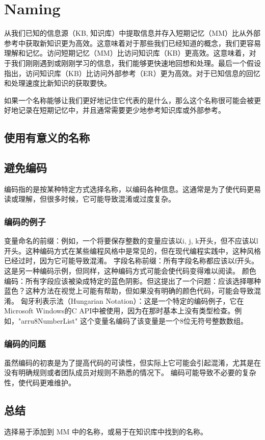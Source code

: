 \documentclass[]{ctexbook}
\begin{document}
\chapter{Naming}

从我们已知的信息源（KB, 知识库）中提取信息并存入短期记忆（MM）比从外部参考中获取新知识更为高效。这意味着对于那些我们已经知道的概念，我们更容易理解和记忆。访问短期记忆（MM）比访问知识库（KB）更高效。这意味着，对于我们刚刚遇到或刚刚学习的信息，我们能够更快速地回想和处理。最后一个假设指出，访问知识库（KB）比访问外部参考（ER）更为高效。对于已知信息的回忆和处理速度比新知识的获取要快。

如果一个名称能够让我们更好地记住它代表的是什么，那么这个名称很可能会被更好地记录在短期记忆中，并且通常需要更少地参考知识库或外部参考。
\section{使用有意义的名称}
\section{避免编码}
编码指的是按某种特定方式选择名称，以编码各种信息。这通常是为了使代码更易读或理解，但很多时候，它可能导致混淆或过度复杂。

\subsection{编码的例子}
变量命名的前缀：例如，一个将要保存整数的变量应该以i, j, k开头，但不应该以l开头。这种编码方式在某些编程风格中是常见的，但在现代编程实践中，这种风格已经过时，因为它可能导致混淆。
字段名称前缀：所有字段名称都应该以f开头。这是另一种编码示例，但同样，这种编码方式可能会使代码变得难以阅读。
颜色编码：所有字段应该被染成特定的蓝色阴影。但这提出了一个问题：应该选择哪种蓝色？这种方法在视觉上可能有帮助，但如果没有明确的颜色代码，可能会导致混淆。
匈牙利表示法（Hungarian Notation）：这是一个特定的编码例子，它在Microsoft Windows的C API中被使用，因为在那时基本上没有类型检查。例如，"arru8NumberList" 这个变量名编码了该变量是一个8位无符号整数数组。

\subsection{编码的问题}
虽然编码的初衷是为了提高代码的可读性，但实际上它可能会引起混淆，尤其是在没有明确规则或者团队成员对规则不熟悉的情况下。
编码可能导致不必要的复杂性，使代码更难维护。

\section{总结}
选择易于添加到 MM 中的名称，或易于在知识库中找到的名称。
\end{document}
